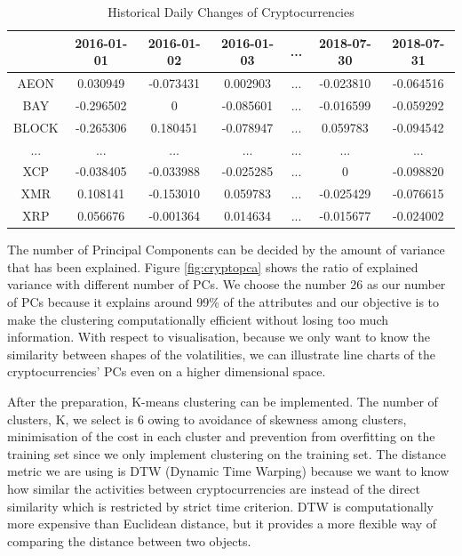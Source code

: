 \documentclass[11pt]{article} %
\theoremstyle{plain}
\theoremstyle{definition}
\begin{document}
{
  \begin{table}[ht]
    \centering
    \scriptsize
    \begin{tabular}{|c|c c c c c c|}
      \hline
       & 2016-01-01 & 2016-01-02 & 2016-01-03 & ... & 2018-07-30 & 2018-07-31 \\ [0.5ex]
      \hline
      AEON & 0.030949 & -0.073431 & 0.002903 & ... & -0.023810 & -0.064516 \\
      \hline
      BAY & -0.296502 & 0 & -0.085601 & ... & -0.016599 & -0.059292 \\
      \hline
      BLOCK & -0.265306 & 0.180451 & -0.078947 & ... & 0.059783 & -0.094542 \\
      \hline
      ... & ... & ... & ... & ... & ... & ... \\
      \hline
      XCP & -0.038405 & -0.033988 & -0.025285 & ... & 0 & -0.098820 \\
      \hline
      XMR & 0.108141 & -0.153010 & 0.059783 & ... & -0.025429 & -0.076615 \\
      \hline
      XRP & 0.056676 & 	-0.001364 & 0.014634 & ... & -0.015677 & -0.024002 \\
      \hline
    \end{tabular}
    \caption{Historical Daily Changes of Cryptocurrencies}
    \label{table:tpcrypto}
  \end{table}
}

The number of Principal Components can be decided by the amount of variance that has been explained. Figure \ref{fig:cryptopca} shows the ratio of explained variance with different number of PCs. We choose the number 26 as our number of PCs because it explains around 99\% of the attributes and our objective is to make the clustering computationally efficient without losing too much information. With respect to visualisation, because we only want to know the similarity between shapes of the volatilities, we can illustrate line charts of the cryptocurrencies' PCs even on a higher dimensional space.

After the preparation, K-means clustering can be implemented. The number of clusters, K, we select is 6 owing to avoidance of skewness among clusters, minimisation of the cost in each cluster and prevention from overfitting on the training set since we only implement clustering on the training set. The distance metric we are using is DTW (Dynamic Time Warping) because we want to know how similar the activities between cryptocurrencies are instead of the direct similarity which is restricted by strict time criterion. DTW is computationally more expensive than Euclidean distance, but it provides a more flexible way of comparing the distance between two objects.
\end{document}
